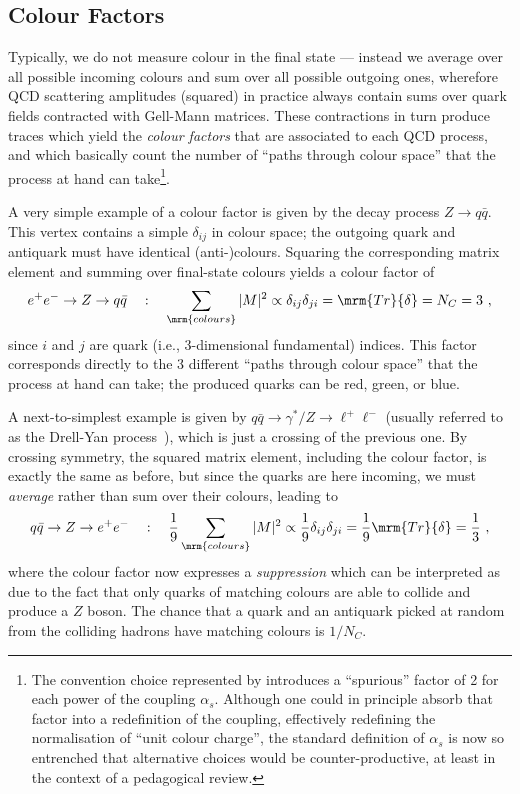 \subsection{Colour Factors}
%
%
%
Typically, we do not measure colour in the final state ---
instead we average over all possible incoming colours and sum over all
possible outgoing ones, wherefore QCD scattering amplitudes (squared) in
practice always contain sums over quark fields contracted with
Gell-Mann matrices. These contractions in turn
produce traces  
which yield the \emph{colour factors} that are associated to each QCD
process, and which basically count the number of ``paths through
colour space'' that the process at hand can take\footnote{The
  convention choice represented by  introduces a
  ``spurious'' factor of 2 for each power of the coupling $\alpha_s$. 
Although one could in principle absorb that factor into a redefinition
of the coupling, effectively redefining the normalisation of ``unit
colour charge'', the standard definition of $\alpha_s$ is now so
entrenched that alternative choices would be counter-productive, at
least in the context of a pedagogical review.}.

A very simple example of a colour factor is given by the decay process $Z\to
q\bar{q}$. This vertex contains a simple $\delta_{ij}$ in colour
space; the outgoing quark and antiquark must have identical 
(anti-)col\-ours. Squaring the corresponding matrix element and summing over
final-state colours yields a colour factor of
\begin{equation}
e^+e^-\to Z \to q\bar{q}~~~:~~~\sum_{\mrm{colours}}|M|^2 \propto
\delta_{ij}\delta_{ji} = \mrm{Tr}\{\delta\} = N_C = 3~,
\end{equation}
since $i$ and $j$ are quark (i.e., 3-dimensional
fundamental) indices. This factor corresponds directly to the 3 different
``paths through colour space'' that the process at hand can take; the
produced quarks can be red, green, or blue. 

A next-to-simplest example is given by $q\bar{q}\to
\gamma^*/Z\to\ell^+\ell^-$ (usually referred to as the
Drell-Yan 
process~\cite{Drell:1970wh}),  
which is just a crossing of the previous one. By crossing
symmetry, the squared matrix element, including the colour factor, is
exactly the same as before, but since the quarks are here incoming, we
must \emph{average} rather than sum over their colours, leading to
\begin{equation}
q\bar{q}\to Z\to e^+e^-~~~:~~~\frac{1}{9}\sum_{\mrm{colours}}|M|^2 \propto \frac19\delta_{ij}\delta_{ji} = \frac19 \mrm{Tr}\{\delta\} = \frac13~,
\end{equation}
where the colour factor now expresses a \emph{suppression} which can
be interpreted as due to the fact that only quarks of matching colours
are able to collide and produce a $Z$ boson. The chance that a quark
and an antiquark picked at random from the colliding hadrons have 
matching colours is $1/N_C$. 
\begin{figure}[t]
\end{figure}

